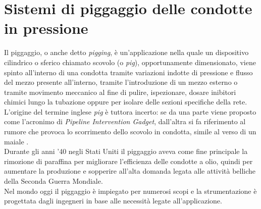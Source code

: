 \clearpage{\pagestyle{empty}\cleardoublepage}

\chapter{Sistemi di piggaggio delle condotte in pressione}\thispagestyle{empty} 
Il piggaggio, o anche detto \textit{pigging}, è un'applicazione nella quale un dispositivo cilindrico o sferico chiamato scovolo (o \textit{pig}), opportunamente dimensionato, viene spinto all'interno di una condotta tramite variazioni indotte di pressione e flusso del mezzo presente all'interno, tramite l'introduzione di un mezzo esterno o tramite movimento meccanico al fine di pulire, ispezionare, dosare inibitori chimici lungo la tubazione oppure per isolare delle sezioni specifiche della rete.\\
L'origine del termine inglese \textit{pig} è tuttora incerto: se da una parte viene proposto come l'acronimo di \textit{Pipeline Intervention Gadget}, dall'altra si fa riferimento al rumore che provoca lo scorrimento dello scovolo in condotta, simile al verso di un maiale \parencite{varghese2011intelligent}.\\
Durante gli anni '40 negli Stati Uniti il piggaggio aveva come fine principale la rimozione di paraffina per migliorare l'efficienza delle condotte a olio, quindi per aumentare la produzione e sopperire all'alta domanda legata alle attività belliche della Seconda Guerra Mondiale.\\
Nel mondo oggi il piggaggio è impiegato per numerosi scopi e la strumentazione  è progettata dagli ingegneri in base alle necessità legate all'applicazione. 

